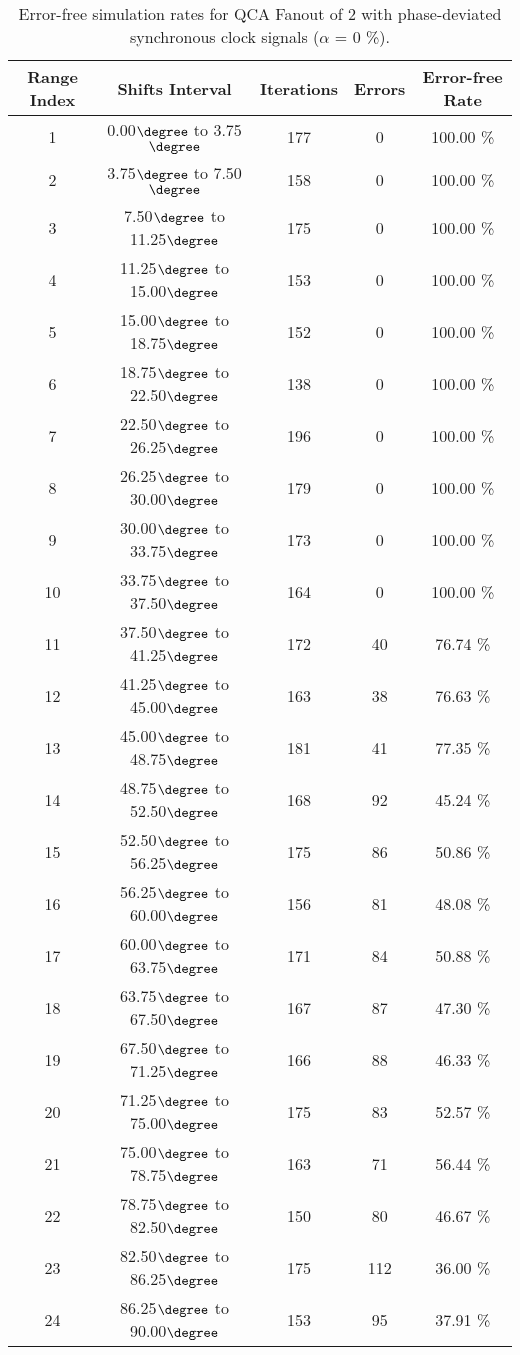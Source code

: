 \flushleft
\begin{table}[h]
\begin{center}
\caption{Error-free simulation rates for QCA Fanout of 2 with phase-deviated synchronous clock signals ($\alpha$ = 0 \%).}
\begin{tabular}{|c|c|c|c|c|}
\hline
\textbf{Range Index} & \textbf{Shifts Interval} & \textbf{Iterations} & \textbf{Errors} & \textbf{Error-free Rate} \\
\hline
1  &  0.00$\degree$ to  3.75$\degree$ & 177 &  0 & 100.00 \% \\
\hline
2  &  3.75$\degree$ to  7.50$\degree$ & 158 &  0 & 100.00 \% \\
\hline
3  &  7.50$\degree$ to 11.25$\degree$ & 175 &  0 & 100.00 \% \\
\hline
4  & 11.25$\degree$ to 15.00$\degree$ & 153 &  0 & 100.00 \% \\
\hline
5  & 15.00$\degree$ to 18.75$\degree$ & 152 &  0 & 100.00 \% \\
\hline
6  & 18.75$\degree$ to 22.50$\degree$ & 138 &  0 & 100.00 \% \\
\hline
7  & 22.50$\degree$ to 26.25$\degree$ & 196 &  0 & 100.00 \% \\
\hline
8  & 26.25$\degree$ to 30.00$\degree$ & 179 &  0 & 100.00 \% \\
\hline
9  & 30.00$\degree$ to 33.75$\degree$ & 173 &  0 & 100.00 \% \\
\hline
10 & 33.75$\degree$ to 37.50$\degree$ & 164 &  0 & 100.00 \% \\
\hline
11 & 37.50$\degree$ to 41.25$\degree$ & 172 & 40 &  76.74 \% \\
\hline
12 & 41.25$\degree$ to 45.00$\degree$ & 163 & 38 &  76.63 \% \\
\hline
13 & 45.00$\degree$ to 48.75$\degree$ & 181 & 41 &  77.35 \% \\
\hline
14 & 48.75$\degree$ to 52.50$\degree$ & 168 & 92 &  45.24 \% \\
\hline
15 & 52.50$\degree$ to 56.25$\degree$ & 175 & 86 &  50.86 \% \\
\hline
16 & 56.25$\degree$ to 60.00$\degree$ & 156 & 81 &  48.08 \% \\
\hline
17 & 60.00$\degree$ to 63.75$\degree$ & 171 & 84 &  50.88 \% \\
\hline
18 & 63.75$\degree$ to 67.50$\degree$ & 167 & 87 &  47.30 \% \\
\hline
19 & 67.50$\degree$ to 71.25$\degree$ & 166 & 88 &  46.33 \% \\
\hline
20 & 71.25$\degree$ to 75.00$\degree$ & 175 & 83 &  52.57 \% \\
\hline
21 & 75.00$\degree$ to 78.75$\degree$ & 163 & 71 &  56.44 \% \\
\hline
22 & 78.75$\degree$ to 82.50$\degree$ & 150 & 80 &  46.67 \% \\
\hline
23 & 82.50$\degree$ to 86.25$\degree$ & 175 & 112 &  36.00 \% \\
\hline
24 & 86.25$\degree$ to 90.00$\degree$ & 153 &  95 &  37.91 \% \\
\hline


\end{tabular}
\end{center}
\end{table}
